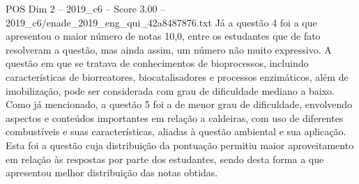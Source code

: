 \begin{textsample}{POS Dim 2 – 2019\_c6 – Score 3.00 – 2019\_c6/enade\_2019\_eng\_qui\_42a8487876.txt}
Já a questão 4 foi a que apresentou o maior número de notas 10,0, entre os estudantes que de fato resolveram a questão, mas ainda assim, um número não muito expressivo.
A questão em que se tratava de conhecimentos de bioprocessos, incluindo características de biorreatores, biocatalisadores e processos enzimáticos, além de imobilização, pode ser considerada com grau de dificuldade mediano a baixo.
Como já mencionado, a questão 5 foi a de menor grau de dificuldade, envolvendo aspectos e conteúdos importantes em relação a caldeiras, com uso de diferentes combustíveis e suas características, aliadas à questão ambiental e sua aplicação.
Esta foi a questão cuja distribuição da pontuação permitiu maior aproveitamento em relação às respostas por parte dos estudantes, sendo desta forma a que apresentou melhor distribuição das notas obtidas.

\end{textsample}
